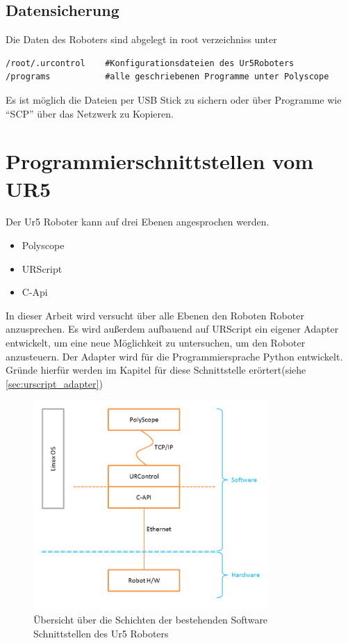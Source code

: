 \subsection{Datensicherung}
\label{sub:ur_datensicherung_gru}

Die Daten des Roboters sind abgelegt in root verzeichniss unter 

\begin{lstlisting}[caption={Pfade Der UR5 Relevanten Dateien}, label=lst:ur5data ,captionpos=b] 
/root/.urcontrol    #Konfigurationsdateien des Ur5Roboters
/programs   		#alle geschriebenen Programme unter Polyscope
\end{lstlisting}

Es ist möglich die Dateien per USB Stick zu sichern oder über Programme wie ``SCP'' über das Netzwerk zu Kopieren.

\section{Programmierschnittstellen vom UR5}
\label{sec:programm_api_uebersicht_gru}

Der Ur5 Roboter kann auf drei Ebenen angesprochen werden.\\

\begin{itemize}
\item Polyscope
\item URScript
\item C-Api
\end{itemize}

In dieser Arbeit wird versucht über alle Ebenen den Roboten Roboter anzusprechen. 
Es wird außerdem aufbauend auf URScript ein eigener Adapter entwickelt, um eine neue Möglichkeit zu untersuchen, um den Roboter anzusteuern.
Der Adapter wird für die Programmiersprache Python entwickelt. Gründe hierfür werden im Kapitel für diese Schnittstelle erörtert(siehe \ref{sec:urscript_adapter})

\begin{figure}[H]
  \centering
    \includegraphics[width=0.8\textwidth]{pic/ur_programming_levels.png}
      \caption[Schichten der Software Schnittstellen]{Übersicht über die
      Schichten der bestehenden Software Schnittstellen des Ur5 Roboters}
      \label{fig:schnittstellen_schichten}
\end{figure}

